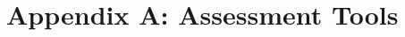 \documentclass[12pt]{article}
\begin{document}

\newpage
\appendix
\section{Appendix A: Assessment Tools}
\end{document}
